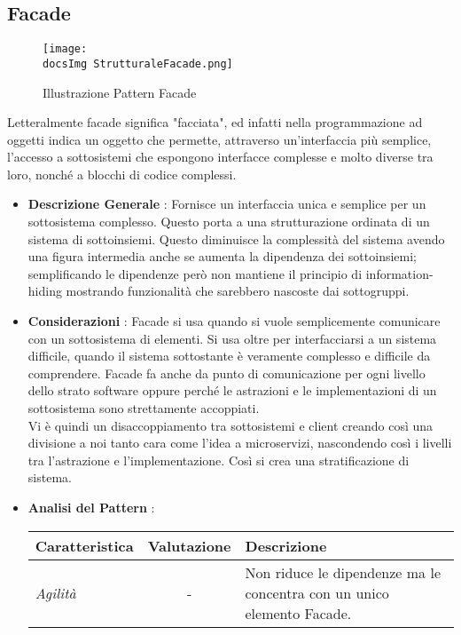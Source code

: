 {{		\subsection{Facade}{
			\begin{figure}[ht]
				\centering
				\texttt{[image: \\docsImg StrutturaleFacade.png]}
				\caption{Illustrazione Pattern Facade}
				\label{Illustrazione Pattern Facade}
			\end{figure}
			Letteralmente facade significa "facciata", ed infatti nella programmazione ad oggetti indica un oggetto che permette, attraverso un'interfaccia più semplice, l'accesso a sottosistemi che espongono interfacce complesse e molto diverse tra loro, nonché a blocchi di codice complessi.
			\begin{itemize}\itemsep1pt
				\item \textbf{Descrizione Generale} : Fornisce un interfaccia unica e semplice per un sottosistema complesso. Questo porta a una strutturazione ordinata di un sistema di sottoinsiemi. Questo diminuisce la complessità del sistema avendo una figura intermedia anche se aumenta la dipendenza dei sottoinsiemi; semplificando le dipendenze però non mantiene il principio di information-hiding mostrando funzionalità che sarebbero nascoste dai sottogruppi.
				\item \textbf{Considerazioni} : Facade si usa quando si vuole semplicemente comunicare con un sottosistema di elementi. Si usa oltre per interfacciarsi a un sistema difficile, quando il sistema sottostante è veramente complesso e difficile da comprendere. Facade fa anche da punto di comunicazione per ogni livello dello strato software oppure perché le astrazioni e le implementazioni di un sottosistema sono strettamente accoppiati.\\
				Vi è quindi un disaccoppiamento tra sottosistemi e client creando così una divisione a noi tanto cara come l'idea a microservizi, nascondendo così i livelli tra l'astrazione e l'implementazione. Così si crea una stratificazione di sistema.
				\item \textbf{Analisi del Pattern} : %
				\small %
				{\renewcommand\arraystretch{1.2} %
					\begin{tabular}{|l|c|l|}
						\hline
						{\textbf{Caratteristica}}&{\textbf{Valutazione}}&{\textbf{Descrizione}}\\
						\hline
						\textit{Agilità} & - & Non riduce le dipendenze ma le concentra con un unico elemento Facade. \\

\end{tabular}}
\end{itemize}}}}
